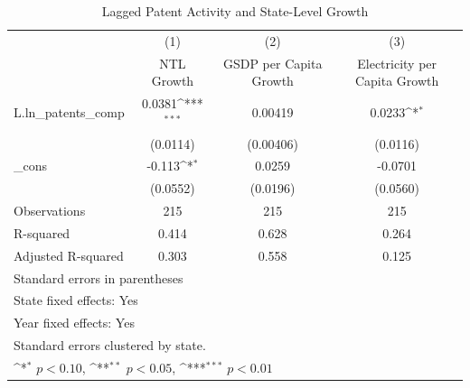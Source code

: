 \begin{table}[htbp]\centering
\def\sym#1{\ifmmode^{#1}\else\(^{#1}\)\fi}
\caption{Lagged Patent Activity and State-Level Growth}
\begin{tabular}{l*{3}{c}}
\hline\hline
            &\multicolumn{1}{c}{(1)}&\multicolumn{1}{c}{(2)}&\multicolumn{1}{c}{(3)}\\
            &\multicolumn{1}{c}{NTL Growth}&\multicolumn{1}{c}{GSDP per Capita Growth}&\multicolumn{1}{c}{Electricity per Capita Growth}\\
\hline
L.ln\_patents\_comp&      0.0381\sym{***}&     0.00419         &      0.0233\sym{*}  \\
            &    (0.0114)         &   (0.00406)         &    (0.0116)         \\
[1em]
\_cons      &      -0.113\sym{*}  &      0.0259         &     -0.0701         \\
            &    (0.0552)         &    (0.0196)         &    (0.0560)         \\
\hline
Observations&         215         &         215         &         215         \\
R-squared   &       0.414         &       0.628         &       0.264         \\
Adjusted R-squared&       0.303         &       0.558         &       0.125         \\
\hline\hline
\multicolumn{4}{l}{\footnotesize Standard errors in parentheses}\\
\multicolumn{4}{l}{\footnotesize State fixed effects: Yes}\\
\multicolumn{4}{l}{\footnotesize Year fixed effects: Yes}\\
\multicolumn{4}{l}{\footnotesize Standard errors clustered by state.}\\
\multicolumn{4}{l}{\footnotesize \sym{*} \(p<0.10\), \sym{**} \(p<0.05\), \sym{***} \(p<0.01\)}\\
\end{tabular}
\end{table}
